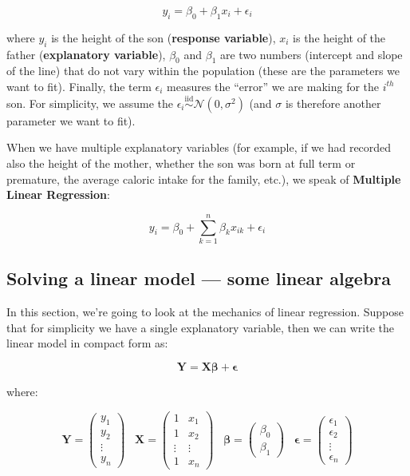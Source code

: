 \documentclass[
  letterpaper,
  DIV=11,
  numbers=noendperiod]{scrreprt}
\begin{document}
\[
y_i = \beta_0 + \beta_1 x_i + \epsilon_i
\]

where \(y_i\) is the height of the son (\textbf{response variable}),
\(x_i\) is the height of the father (\textbf{explanatory variable}),
\(\beta_0\) and \(\beta_1\) are two numbers (intercept and slope of the
line) that do not vary within the population (these are the parameters
we want to fit). Finally, the term \(\epsilon_i\) measures the ``error''
we are making for the \(i^{th}\) son. For simplicity, we assume the
\(\epsilon_i \overset{\text{iid}}{\sim} \mathcal N(0, \sigma^2)\) (and
\(\sigma\) is therefore another parameter we want to fit).

When we have multiple explanatory variables (for example, if we had
recorded also the height of the mother, whether the son was born at full
term or premature, the average caloric intake for the family, etc.), we
speak of \textbf{Multiple Linear Regression}:

\[
y_i = \beta_0 + \sum_{k=1}^n \beta_k x_{ik} + \epsilon_i
\]

\hypertarget{solving-a-linear-model-some-linear-algebra}{%
\subsection{Solving a linear model --- some linear
algebra}\label{solving-a-linear-model-some-linear-algebra}}

In this section, we're going to look at the mechanics of linear
regression. Suppose that for simplicity we have a single explanatory
variable, then we can write the linear model in compact form as:

\[
\mathbf{Y} = \mathbf{X} \mathbf{\beta} + \mathbf{\epsilon}
\]

where:

\[
\mathbf{Y} = \begin{pmatrix} y_1\\ y_2\\ \vdots \\ y_n \end{pmatrix} \;\;\; 
\mathbf{X} = \begin{pmatrix} 1 & x_1\\ 1 & x_2\\ \vdots & \vdots \\ 1 & x_n \end{pmatrix}
 \;\;\; 
\mathbf{\beta} = \begin{pmatrix} \beta_0 \\ \beta_1\end{pmatrix} \;\;\; \mathbf{\epsilon} = \begin{pmatrix} \epsilon_1 \\ \epsilon_2 \\ \vdots \\ \epsilon_n \end{pmatrix}
\]
\end{document}
